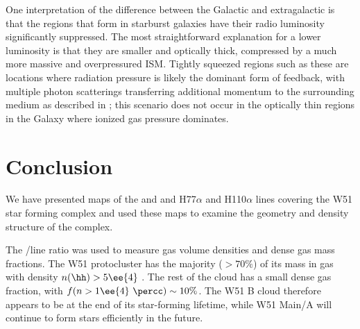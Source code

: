 One interpretation of the difference between the Galactic and
extragalactic \formaldehyde is that the \hii regions that form in starburst
galaxies have their radio luminosity significantly suppressed.  The most
straightforward explanation for a lower luminosity is that they are smaller and
optically thick, compressed by a much more massive and overpressured
ISM.  Tightly squeezed \hii regions such as these are locations where radiation
pressure is likely the dominant form of feedback, with multiple photon
scatterings transferring additional momentum to the surrounding medium as
described in \citet{Murray2010b}; this scenario does not occur in the optically
thin \hii regions in the Galaxy where ionized gas pressure dominates.


\section{Conclusion}
\label{sec:conclusion}
We have presented maps of the \formaldehyde \oneone and \twotwo and H77$\alpha$
and H110$\alpha$ lines covering the W51 star forming complex and used these maps
to examine the geometry and density structure of the complex.  





The \formaldehyde \oneone/\twotwo line ratio was used to measure gas volume
densities and dense gas mass fractions.  The W51 protocluster has the majority
($>70\%$) of its mass in gas with density $n(\hh)>5\ee{4}$ \percc.  The rest of
the cloud has a small dense gas fraction, with $f(n>1\ee{4}~\percc) \sim 10\%$.
The W51 B cloud therefore appears to be at the end of its star-forming
lifetime, while W51 Main/A will continue to form stars efficiently in the
future.

